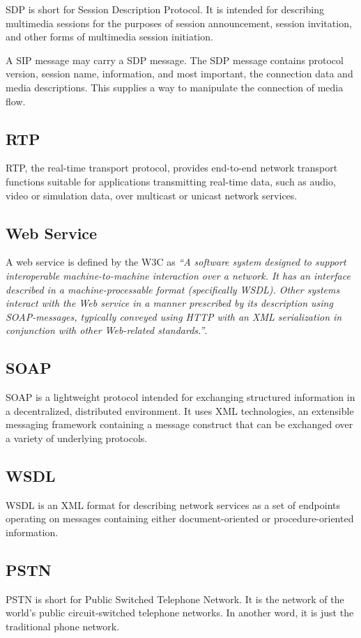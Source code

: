SDP is short for Session Description Protocol. It is intended for describing multimedia sessions for the purposes of session announcement, session invitation, and other forms of multimedia session initiation.\cite{RFC4566}

A SIP message may carry a SDP message. The SDP message contains protocol version, session name, information, and most important, the connection data and media descriptions. This supplies a way to manipulate the connection of media flow. 

\subsection*{RTP}
\label{sec:RTP}
\label{sym:RTP}

RTP, the real-time transport protocol, provides end-to-end network transport functions suitable for applications transmitting real-time data, such as audio, video or simulation data, over multicast or unicast network services.\cite{RFC3550}

\subsection*{Web Service}
\label{sec:WebService}

A web service is defined by the W3C as \textit{``A software system designed to support interoperable machine-to-machine interaction over a network. It has an interface described in a machine-processable format (specifically WSDL). Other systems interact with the Web service in a manner prescribed by its description using SOAP-messages, typically conveyed using HTTP with an XML serialization in conjunction with other Web-related standards.''}.\cite{WebServicesW3C}

\subsection*{SOAP}
\label{sec:SOAP}
\label{sym:SOAP}

SOAP is a lightweight protocol intended for exchanging structured information in a decentralized, distributed environment. It uses XML technologies, an extensible messaging framework containing a message construct that can be exchanged over a variety of underlying protocols.\cite{SOAPVersion1dot2}

\subsection*{WSDL}
\label{sec:WSDL}
\label{sym:WSDL}

WSDL is an XML format for describing network services as a set of endpoints operating on messages containing either document-oriented or procedure-oriented information.\cite{WSDL1dot1} 

\subsection*{PSTN}
\label{sym:PSTN} 
\label{sec:PSTN}

PSTN is short for Public Switched Telephone Network. It is the network of the world's public circuit-switched telephone networks. In another word, it is just the traditional phone network.
